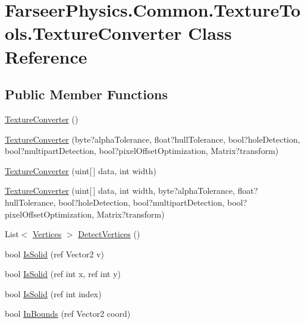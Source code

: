 \hypertarget{class_farseer_physics_1_1_common_1_1_texture_tools_1_1_texture_converter}{\section{Farseer\+Physics.\+Common.\+Texture\+Tools.\+Texture\+Converter Class Reference}
\label{class_farseer_physics_1_1_common_1_1_texture_tools_1_1_texture_converter}
}
\subsection*{Public Member Functions}
\begin{DoxyCompactItemize}
\item 
\hyperlink{class_farseer_physics_1_1_common_1_1_texture_tools_1_1_texture_converter_a8fd7eac2279567f34ac900d0dae81e1c}{Texture\+Converter} ()
\item 
\hyperlink{class_farseer_physics_1_1_common_1_1_texture_tools_1_1_texture_converter_a44552f9f3192067d667b4838fd6a8baa}{Texture\+Converter} (byte?alpha\+Tolerance, float?hull\+Tolerance, bool?hole\+Detection, bool?multipart\+Detection, bool?pixel\+Offset\+Optimization, Matrix?transform)
\item 
\hyperlink{class_farseer_physics_1_1_common_1_1_texture_tools_1_1_texture_converter_a501ff35a7421e27f353a0f9fff7f582b}{Texture\+Converter} (uint\mbox{[}$\,$\mbox{]} data, int width)
\item 
\hyperlink{class_farseer_physics_1_1_common_1_1_texture_tools_1_1_texture_converter_af2fd302f4f9e67525b2110a58908d685}{Texture\+Converter} (uint\mbox{[}$\,$\mbox{]} data, int width, byte?alpha\+Tolerance, float?hull\+Tolerance, bool?hole\+Detection, bool?multipart\+Detection, bool?pixel\+Offset\+Optimization, Matrix?transform)
\item 
List$<$ \hyperlink{class_farseer_physics_1_1_common_1_1_vertices}{Vertices} $>$ \hyperlink{class_farseer_physics_1_1_common_1_1_texture_tools_1_1_texture_converter_a87129b24da5ae834791097c935d55241}{Detect\+Vertices} ()
\item 
bool \hyperlink{class_farseer_physics_1_1_common_1_1_texture_tools_1_1_texture_converter_a146b64a9a847b3af2f47d2aa0f1bdd89}{Is\+Solid} (ref Vector2 v)
\item 
bool \hyperlink{class_farseer_physics_1_1_common_1_1_texture_tools_1_1_texture_converter_aa6cec99696c7682edd70381a26dbdc3a}{Is\+Solid} (ref int x, ref int y)
\item 
bool \hyperlink{class_farseer_physics_1_1_common_1_1_texture_tools_1_1_texture_converter_a173cd26b1cd3aa79a038edf2475955b2}{Is\+Solid} (ref int index)
\item 
bool \hyperlink{class_farseer_physics_1_1_common_1_1_texture_tools_1_1_texture_converter_adc0ff63493327ae1045bcee674ce3e61}{In\+Bounds} (ref Vector2 coord)
\end{DoxyCompactItemize}
